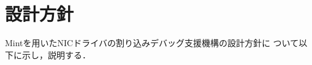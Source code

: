 \documentclass[tanilab-enum]{graduate}
\begin{document}
%
\section{設計方針}\label{sekkeihousin}
Mintを用いたNICドライバの割り込みデバッグ支援機構の設計方針に
ついて以下に示し，説明する．
\end{document}
